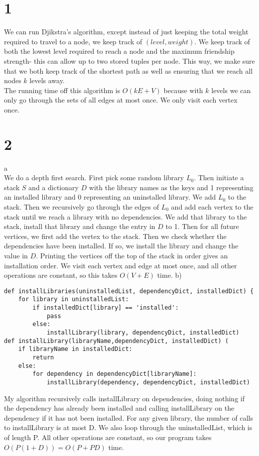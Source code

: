 \documentclass[10pt,a4paper]{article}
\begin{document}
\maketitle
\tableofcontents
\section*{1}
We can run Djikstra's algorithm, except instead of just keeping the total weight required to travel to a node, we keep track of $(level, weight)$. We keep track of both the lowest level required to reach a node and the maximum friendship strength- this can allow up to two stored tuples per node. This way, we make sure that we both keep track of the shortest path as well as ensuring that we reach all nodes $k$ levels away. \\
The running time off this algorithm is $O(kE+V)$ because with $k$ levels we can only go through the sets of all edges at most once. We only visit each vertex once.
\section*{2}
a\\
We do a depth first search. First pick some random library $L_0$. Then initiate a stack $S$ and a dictionary $D$ with the library names as the keys and 1 representing an installed library and 0 representing an uninstalled library. We add $L_0$ to the stack. Then we recursively go through the edges of $L_0$ and add each vertex to the stack until we reach a library with no dependencies. We add that library to the stack, install that library and change the entry in $D$ to 1. 
Then for all future vertices, we first add the vertex to the stack. Then we check whether the dependencies have been installed. If so, we install the library and change the value in $D$. 
Printing the vertices off the top of the stack in order gives an installation order. We visit each vertex and edge at most once, and all other operations are constant, so this takes $O(V+E)$ time.
b) 
\begin{lstlisting}
def installLibraries(uninstalledList, dependencyDict, installedDict) {
	for library in uninstalledList:
		if installedDict[library] == 'installed':
			pass
		else:
			installLibrary(library, dependencyDict, installedDict)
def installLibrary(libraryName,dependencyDict, installedDict) (
	if libraryName in installedDict:
		return
	else:
		for dependency in dependencyDict[libraryName]:
			installLibrary(dependency, dependencyDict, installedDict)
\end{lstlisting}
My algorithm recursively calls installLibrary on dependencies, doing nothing if the dependency has already been installed and calling installLibrary on the dependency if it has not been installed. For any given library, the number of calls to installLibrary is at most D. We also loop through the uninstalledList, which is of length P. All other operations are constant, so our program takes $O(P(1+D))=O(P+PD)$ time.
\end{document}
